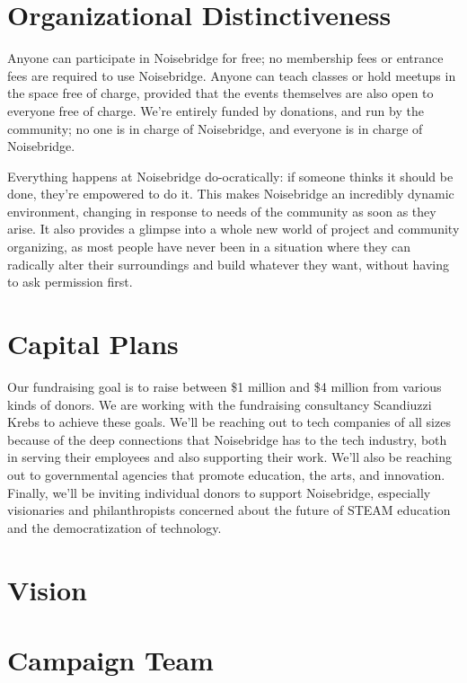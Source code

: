 \documentclass[12pt]{article}
\begin{document}
\section{Organizational Distinctiveness}

Anyone can participate in Noisebridge for free; no membership fees or entrance fees are required to use Noisebridge. Anyone can teach classes or hold meetups in the space free of charge, provided that the events themselves are also open to everyone free of charge. We're entirely funded by donations, and run by the community; no one is in charge of Noisebridge, and everyone is in charge of Noisebridge.

Everything happens at Noisebridge do-ocratically: if someone thinks it should be done, they're empowered to do it. This makes Noisebridge an incredibly dynamic environment, changing in response to needs of the community as soon as they arise. It also provides a glimpse into a whole new world of project and community organizing, as most people have never been in a situation where they can radically alter their surroundings and build whatever they want, without having to ask permission first.

\section{Capital Plans}

Our fundraising goal is to raise between \$1 million and \$4 million from various kinds of donors. We are working with the fundraising consultancy Scandiuzzi Krebs to achieve these goals. We'll be reaching out to tech companies of all sizes because of the deep connections that Noisebridge has to the tech industry, both in serving their employees and also supporting their work. We'll also be reaching out to governmental agencies that promote education, the arts, and innovation. Finally, we'll be inviting individual donors to support Noisebridge, especially visionaries and philanthropists concerned about the future of STEAM education and the democratization of technology.

\section{Vision}

\section{Campaign Team}
\end{document}
